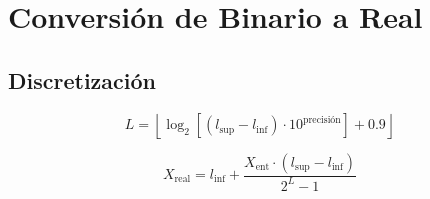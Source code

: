 \documentclass[11pt, letterpaper]{article}
\begin{document}
\section*{Conversión de Binario a Real}

\subsection*{Discretización}

\[
L = \left\lfloor \log_2 \left[ (l_{\text{sup}} - l_{\text{inf}}) \cdot 10^{\text{precisión}} \right] + 0.9 \right\rfloor
\]

\[
X_{\text{real}} = l_{\text{inf}} + \dfrac{X_{\text{ent}} \cdot (l_{\text{sup}} - l_{\text{inf}})}{2^L - 1}
\]

	
	
\end{document}

